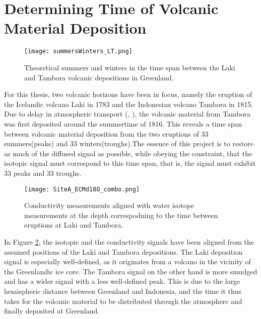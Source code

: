 \documentclass[../../CompleteThesis2/Complete_2ndDraft]{subfiles}
\begin{document}
\section[Volcanic Horizons][Volcanic Horizons]{Determining Time of Volcanic Material Deposition}
\label{Sec:Data_VolcanicHorizons}

\begin{figure}[h]
	\centering
	\texttt{[image: summersWinters\_LT.png]}
	\caption[Summers and Winters between Laki and Tambora]{\footnotesize Theoretical summers and winters in the time span between the Laki and Tambora volcanic depositions in Greenland.}
	\label{Fig:SummersAndWintersLT}
\end{figure}

For this thesis, two volcanic horizons have been in focus, namely the eruption of the Icelandic volcano Laki in 1783 and the Indonesian volcano Tambora in 1815. Due to delay in atmospheric transport (\cite[Wei et al., 2008]{Wei2008}, \cite[Cole-Dai et al, 2009]{Dai2009}), the volcanic material from Tambora was first deposited around the summertime of 1816. This reveals a time span between volcanic material deposition from the two eruptions of 33 summers(peaks) and 33 winters(troughs).The essence of this project is to restore as much of the diffused signal as possible, while obeying the constraint, that the isotopic signal must correspond to this time span, that is, the signal must exhibit 33 peaks and 33 troughs.


\begin{figure}[h]
	\centering
	\texttt{[image: SiteA\_ECMd18O\_combo.png]}
	\caption{\footnotesize Conductivity measurements aligned with water isotope measurements at the depth correspodning to the time between eruptions at Laki and Tambora.}
	\label{Fig:DATA_SiteA_ECM_d18O_combo}
\end{figure}
In Figure \ref{Fig:DATA_SiteA_ECM_d18O_combo}, the isotopic and the conductivity signals have been aligned from the assumed positions of the Laki and Tambora depositions. The Laki deposition signal is especially well-defined, as it originates from a volcano in the vicinity of the Greenlandic ice core. The Tambora signal on the other hand is more smudged and has a wider signal with a less well-defined peak. This is due to the large hemispheric distance between Greenland and Indonesia, and the time it thus takes for the volcanic material to be distributed through the atmosphere and finally deposited at Greenland.
\end{document}
